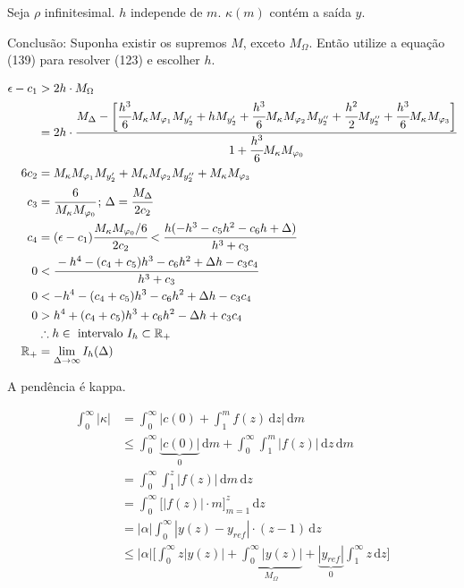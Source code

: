 \documentclass[12pt]{article}
\begin{document}
Seja $\rho$ infinitesimal. $h$ independe de $m$. $\kappa(m)$ cont\'em a sa\'ida $y$.

Conclus\~ao: Suponha existir os supremos $M$, exceto $M_{\Omega}$. Ent\~ao utilize a equa\c{c}\~ao (139) para resolver (123) e escolher $h$.

\begin{align}
\epsilon - c_1 &> 2h\cdot M_{\Omega} \\
&= 2h \cdot \cfrac{M_{\Delta}  - \bigg[\cfrac{h^3}{6} M_{\kappa} M_{\varphi_1} M_{y_2'} + h M_{y_2'} +  \cfrac{h^3}{6} M_{\kappa} M_{\varphi_2} M_{y_2''} + \cfrac{h^2}{2} M_{y_2''} + \cfrac{h^3}{6} M_{\kappa} M_{\varphi_3}\bigg]}{1 + \cfrac{h^3}{6} M_{\kappa} M_{\varphi_0}}   \\
6 c_2 &=  M_{\kappa} M_{\varphi_1} M_{y_2'} + M_{\kappa} M_{\varphi_2} M_{y_2''} + M_{\kappa} M_{\varphi_3} \\
c_3 &= \cfrac{6}{ M_{\kappa} M_{\varphi_0}}\,;\,\Delta = \cfrac{M_{\Delta}}{2c_2} \\
c_4 &= (\epsilon - c_1) \cfrac{M_{\kappa} M_{\varphi_0}/6}{2c_2} < \cfrac{h(-h^3 - c_5 h^2 - c_6 h + \Delta )}{h^3 + c_3} \\
0 &< \cfrac{-h^4 - (c_4 + c_5) h^3 - c_6 h^2 + \Delta h - c_3 c_4}{h^3 + c_3} \\
0 &< -h^4 - (c_4 + c_5) h^3 - c_6 h^2 + \Delta h - c_3 c_4 \\
0 &> h^4 + (c_4 + c_5) h^3 + c_6 h^2 - \Delta h + c_3 c_4 \\
&\therefore h \in \text{ intervalo }I_h \subset \mathbb{R}_+ \\
\mathbb{R}_+ &= \lim_{\Delta \to \infty} I_h(\Delta)
\end{align}

A pend\^encia \'e kappa.

\begin{align}
\int_0^{\infty} |\kappa| &= \int_0^{\infty} \bigg| c(0) + \int_1^m f(z) \,\mathrm{d}z \bigg| \,\mathrm{d}m \\\
&\le \int_0^{\infty} \underbrace{|c(0)|}_0 \,\mathrm{d}m + \int_0^{\infty} \int_1^m |f(z)| \,\mathrm{d}z \,\mathrm{d}m \\
&= \int_0^{\infty} \int_1^z |f(z)| \,\mathrm{d}m \,\mathrm{d}z \\
&= \int_0^{\infty} \bigg[ |f(z)| \cdot m\bigg]_{m = 1}^z \,\mathrm{d}z \\
&= |\alpha| \int_0^{\infty}  | y(z) - y_{ref} | \cdot (z-1) \,\mathrm{d}z \\
&\le |\alpha| \bigg[ \int_0^{\infty} z | y(z)| + \underbrace{\int_0^{\infty}  | y(z) |}_{M_{\Omega}}   + \underbrace{| y_{ref}|}_0 \int_1^{\infty} z \,\mathrm{d}z \bigg]
\end{align}
\end{document}
